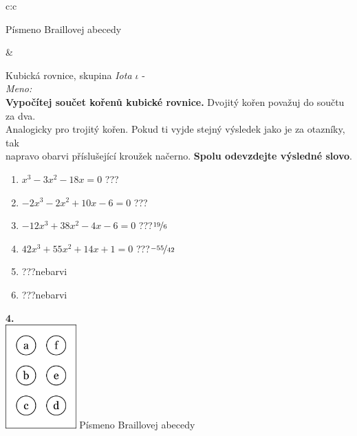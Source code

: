 \documentclass[10pt]{report}
\begin{document}
\begin{tabular}{c:c}
\begin{minipage}[c][99mm][t]{0.49\linewidth}
\begin{center}
\begin{minipage}{0.20\linewidth}
\begin{center}
{\small Písmeno Braillovej abecedy}
\end{center}
\end{minipage}
\end{center}
\end{minipage}
&
\begin{minipage}[c][99mm][t]{0.49\linewidth}
\begin{center}
\vspace{7mm}
{\huge Kubická rovnice, skupina \textit{Iota $\iota$} -}\\[4.5mm]
\textit{Meno:}\phantom{xxxxxxxxxxxxxxxxxxxxxxxxxxxxxxxxxxxxxxxxxxxxxxxxxxxxxxxxxxxxxxxxx}\\[3.5mm]
\textbf{Vypočítej součet kořenů kubické rovnice.} Dvojitý kořen považuj do součtu za dva.\\Analogicky pro trojitý kořen. Pokud ti vyjde stejný výsledek jako je za otazníky, tak\\napravo obarvi příslušející kroužek načerno. \textbf{Spolu odevzdejte výsledné slovo}.\\[3mm]
\begin{minipage}{0.77\linewidth}
\begin{center}
\begin{varwidth}{\textwidth}
\begin{enumerate}
\large
\item $x^3-3x^2-18x=0$\quad \dotfill\; ???\;\dotfill {}
\item $-2x^3-2x^2+10x-6=0$\quad \dotfill\; ???\;\dotfill {}
\item $-12x^3+38x^2-4x-6=0$\quad \dotfill\; ???\;\dotfill \quad $\nicefrac{19}{6}$
\item $42x^3+55x^2+14x+1=0$\quad \dotfill\; ???\;\dotfill \quad $\nicefrac{-55}{42}$
\item \quad \dotfill\; ???\;\dotfill \quad nebarvi
\item \quad \dotfill\; ???\;\dotfill \quad nebarvi
\end{enumerate}
\end{varwidth}
\end{center}
\end{minipage}
\begin{minipage}{0.20\linewidth}
\begin{center}
{\Huge\bfseries 4.} \\[2mm]
\includegraphics[height=40mm]{../images/braille.png}
{\small Písmeno Braillovej abecedy}
\end{center}
\end{minipage}
\end{center}
\end{minipage}

\end{tabular}
\end{document}
